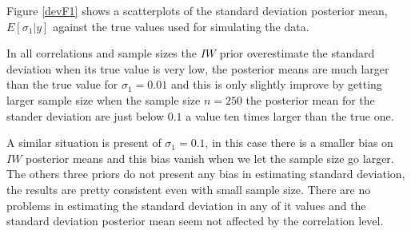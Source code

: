 \documentclass[a4paper]{article}
\begin{document}
Figure \ref{devF1} shows a scatterplots of the standard deviation posterior mean, $E[\sigma_1\vert y]$  against the true values used for simulating the data. 

In all correlations and sample sizes the $IW$ prior overestimate the standard deviation when its true value is very low, the posterior means are much larger than the true value for $\sigma_1=0.01$ and this is only slightly improve by getting larger sample size when the sample size $n=250$ the posterior mean for the stander deviation are just below $0.1$ a value ten times larger than the true one.  

A similar situation is present of $\sigma_1=0.1$, in this case there is a smaller bias on $IW$ posterior means and this bias vanish when we let the sample size go larger.  The others three priors do not present any bias in estimating standard deviation, the results are pretty consistent even with small sample size. There are no problems in estimating the standard deviation in any of it values and the standard deviation posterior mean seem not affected by the correlation level.  
\end{document}
